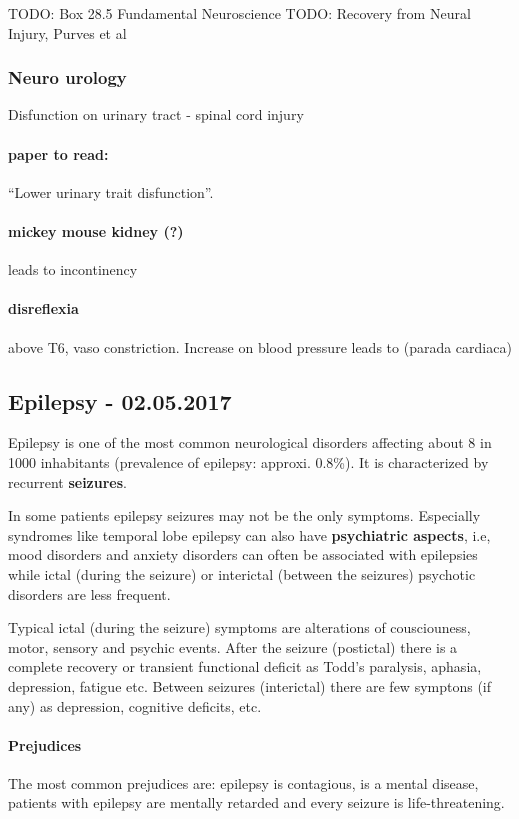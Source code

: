 \documentclass[12pt,article,oneside,a4paper]{memoir}
\begin{document}
TODO: Box 28.5 Fundamental Neuroscience
TODO: Recovery from Neural Injury, Purves et al
\subsubsection{Neuro urology}
Disfunction on urinary tract - spinal cord injury
\paragraph{paper to read:} ``Lower urinary trait disfunction''.

\paragraph{mickey mouse kidney (?)} leads to incontinency

\paragraph{disreflexia}  above T6, vaso constriction. Increase on blood pressure leads to (parada cardiaca)

\newpage
\subsection{Epilepsy - 02.05.2017}
Epilepsy is one of the most common neurological disorders affecting about 8 in 1000 inhabitants (prevalence of epilepsy: approxi. 0.8\%). It is characterized by recurrent \textbf{seizures}.

In some patients epilepsy seizures may not be the only symptoms. Especially syndromes like temporal lobe epilepsy can also have \textbf{psychiatric aspects}, i.e, mood disorders and anxiety disorders can often be associated with epilepsies while ictal (during the seizure) or interictal (between the seizures) psychotic disorders are less frequent.

Typical ictal (during the seizure) symptoms are alterations of cousciouness, motor, sensory and psychic events. After the seizure (postictal) there is a complete recovery or transient functional deficit as Todd's paralysis, aphasia, depression, fatigue etc. Between seizures (interictal) there are few symptons (if any) as depression, cognitive deficits, etc.

\paragraph{Prejudices} The most common prejudices are: epilepsy is contagious, is a mental disease, patients with epilepsy are mentally retarded and every seizure is life-threatening.
\end{document}
